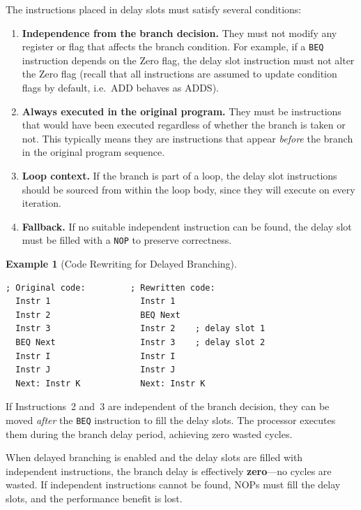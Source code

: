 \documentclass[11pt, a4paper, notitlepage]{report}
\theoremstyle{definition}
\theoremstyle{remark}
\theoremstyle{definition}
\newtheorem{example}[theorem]{Example}
\begin{document}
The instructions placed in delay slots must satisfy several conditions:

\begin{enumerate}
  \item \textbf{Independence from the branch decision.} They must not modify any register or flag that affects the branch condition. For example, if a \texttt{BEQ} instruction depends on the Zero flag, the delay slot instruction must not alter the Zero flag (recall that all instructions are assumed to update condition flags by default, i.e.\ ADD behaves as ADDS).
  \item \textbf{Always executed in the original program.} They must be instructions that would have been executed regardless of whether the branch is taken or not. This typically means they are instructions that appear \emph{before} the branch in the original program sequence.
  \item \textbf{Loop context.} If the branch is part of a loop, the delay slot instructions should be sourced from within the loop body, since they will execute on every iteration.
  \item \textbf{Fallback.} If no suitable independent instruction can be found, the delay slot must be filled with a \texttt{NOP} to preserve correctness.
\end{enumerate}

\begin{example}[Code Rewriting for Delayed Branching]
\label{ex:delayed-branching}
\leavevmode
\begin{lstlisting}
; Original code:         ; Rewritten code:
  Instr 1                  Instr 1
  Instr 2                  BEQ Next
  Instr 3                  Instr 2    ; delay slot 1
  BEQ Next                 Instr 3    ; delay slot 2
  Instr I                  Instr I
  Instr J                  Instr J
  Next: Instr K            Next: Instr K
\end{lstlisting}
If Instructions~2 and~3 are independent of the branch decision, they can be moved \emph{after} the \texttt{BEQ} instruction to fill the delay slots. The processor executes them during the branch delay period, achieving zero wasted cycles.
\end{example}

\begin{keyresult}[title={Key Result: Delayed Branching}]
  When delayed branching is enabled and the delay slots are filled with independent instructions, the branch delay is effectively \textbf{zero}---no cycles are wasted. If independent instructions cannot be found, NOPs must fill the delay slots, and the performance benefit is lost.
\end{keyresult}
\end{document}
